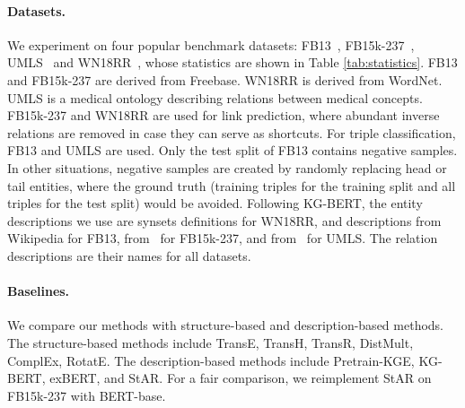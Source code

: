 \documentclass{article}
\newcommand{\wxt}[1]{{#1}}
\begin{document}
\paragraph{\textbf{Datasets.}}  
We experiment on four popular benchmark datasets: 
FB13~\cite{socher2013ntn}, 
FB15k-237~\cite{toutanova2015fb15k237}, UMLS~\cite{dettmers2018wn18rr} and WN18RR~\cite{dettmers2018wn18rr}, whose statistics are shown in Table \ref{tab:statistics}.
FB13 and FB15k-237 are derived from Freebase.
WN18RR is derived from WordNet. 
UMLS is a medical ontology describing relations between medical concepts. 
FB15k-237 and WN18RR are used for link prediction, where abundant inverse relations are removed in case they can serve as shortcuts. 
For triple classification, FB13 and UMLS are used.
Only the test split of FB13 contains negative samples.
In other situations, negative samples are created by randomly replacing head or tail entities, where the ground truth (training triples for the training split and all triples for the test split) would be avoided. 
Following KG-BERT, the entity descriptions we use are 
synsets definitions for WN18RR, and descriptions from Wikipedia for FB13, from~\cite{xie2016dkrl} for FB15k-237, and from~\cite{yao2019kgbert} for UMLS. 
The relation descriptions are their names for all datasets. 

\begin{table}[h!]
    \small
    \centering
    \caption{Statistics of the datasets. \wxt{Avg DL means the average length (number of words) of descriptions.}}
    \label{tab:statistics}
\end{table}


\paragraph{\textbf{Baselines.}}  
We compare our methods with structure-based and description-based methods.
The structure-based methods include TransE, TransH, TransR, DistMult, ComplEx, RotatE. The description-based methods include Pretrain-KGE, KG-BERT, exBERT, and StAR. For a fair comparison, we reimplement StAR on FB15k-237 with BERT-base.
\end{document}
